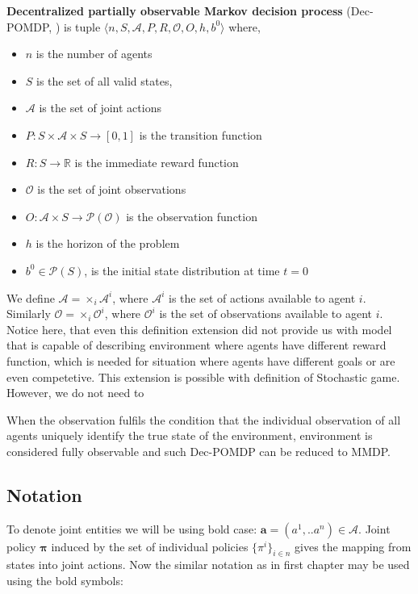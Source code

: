 \textbf{Decentralized partially observable Markov decision process} (Dec-POMDP, \cite{DecPOMDP}) is tuple
$\langle n, S, \mathcal{A}, P, R, \mathcal{O}, O, h, b^0\rangle$ where,
\begin{itemize}
    \item $n$ is the number of agents
    \item $S$ is the set of all valid states,
    \item $\mathcal{A} $ is the set of joint actions
    \item $P: S \times \mathcal{A} \times S \rightarrow [0,1]$ is the transition function
    \item $R: S  \rightarrow \mathbb{R}$ is the immediate reward function
    \item $\mathcal{O}$ is the set of joint observations
    \item $O: \mathcal{A} \times S \rightarrow \mathcal{P}(\mathcal{O})$ is the observation function
    \item $h$ is the horizon of the problem
    \item $b^0 \in \mathcal{P}(S)$, is the initial state distribution at time $t=0$

\end{itemize}

We define $\mathcal{A}  = \times_i \mathcal{A}^i$, where $\mathcal{A}^i$ is the set of actions available to agent $i$.
Similarly $\mathcal{O} = \times_i \mathcal{O}^i$, where $\mathcal{O}^i$ is the set of observations available to agent $i$. 
Notice here, that even this definition extension did not provide us with model that is capable of describing environment where agents have different reward function, which is needed for situation where agents have different goals or are even competetive.
This extension is possible with definition of Stochastic game. 
However, we do not need to 

When the observation fulfils the condition that the individual observation of all agents uniquely identify the true state of the environment, environment is considered fully observable and such Dec-POMDP can be reduced to MMDP.
\subsection*{Notation}
To denote joint entities we will be using bold case:
$\boldsymbol{a}=(a^1,..a^n) \in \mathcal{A}$.
Joint policy $\boldsymbol{\pi}$ induced by the set of individual policies ${\{\pi^i\}}_{i \in n}$  gives the mapping from states into joint actions.
Now the similar notation as in first chapter may be used using the bold symbols:

